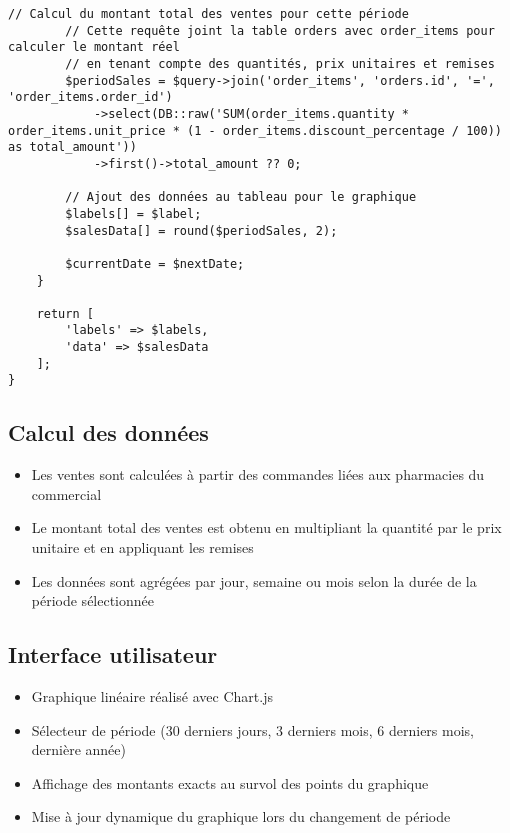 \documentclass[12pt,a4paper]{article}
\begin{document}
\begin{lstlisting}[caption=Méthode prepareSalesChartData]
        // Calcul du montant total des ventes pour cette période
        // Cette requête joint la table orders avec order_items pour calculer le montant réel
        // en tenant compte des quantités, prix unitaires et remises
        $periodSales = $query->join('order_items', 'orders.id', '=', 'order_items.order_id')
            ->select(DB::raw('SUM(order_items.quantity * order_items.unit_price * (1 - order_items.discount_percentage / 100)) as total_amount'))
            ->first()->total_amount ?? 0;
        
        // Ajout des données au tableau pour le graphique
        $labels[] = $label;
        $salesData[] = round($periodSales, 2);
        
        $currentDate = $nextDate;
    }
    
    return [
        'labels' => $labels,
        'data' => $salesData
    ];
}
\end{lstlisting}

\subsection{Calcul des données}
\begin{itemize}
    \item Les ventes sont calculées à partir des commandes liées aux pharmacies du commercial
    \item Le montant total des ventes est obtenu en multipliant la quantité par le prix unitaire et en appliquant les remises
    \item Les données sont agrégées par jour, semaine ou mois selon la durée de la période sélectionnée
\end{itemize}

\subsection{Interface utilisateur}
\begin{itemize}
    \item Graphique linéaire réalisé avec Chart.js
    \item Sélecteur de période (30 derniers jours, 3 derniers mois, 6 derniers mois, dernière année)
    \item Affichage des montants exacts au survol des points du graphique
    \item Mise à jour dynamique du graphique lors du changement de période
\end{itemize}
\end{document}

